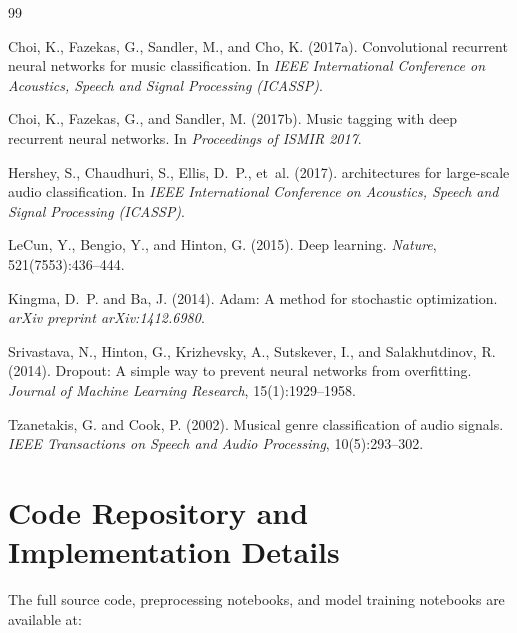 \documentclass[12pt, a4paper]{article}
\begin{document}
\begin{thebibliography}{99}

Choi, K., Fazekas, G., Sandler, M., and Cho, K. (2017a).
\newblock Convolutional recurrent neural networks for music classification.
\newblock In \textit{IEEE International Conference on Acoustics, Speech and Signal
Processing (ICASSP)}.

Choi, K., Fazekas, G., and Sandler, M. (2017b).
\newblock Music tagging with deep recurrent neural networks.
\newblock In \textit{Proceedings of ISMIR 2017}.

Hershey, S., Chaudhuri, S., Ellis, D.~P., et~al. (2017).
 architectures for large-scale audio classification.
\newblock In \textit{IEEE International Conference on Acoustics, Speech and Signal
Processing (ICASSP)}.

LeCun, Y., Bengio, Y., and Hinton, G. (2015).
\newblock Deep learning.
\newblock \textit{Nature}, 521(7553):436--444.

Kingma, D.~P. and Ba, J. (2014).
\newblock Adam: A method for stochastic optimization.
\newblock \textit{arXiv preprint arXiv:1412.6980}.

Srivastava, N., Hinton, G., Krizhevsky, A., Sutskever, I., and Salakhutdinov, R. (2014).
\newblock Dropout: A simple way to prevent neural networks from overfitting.
\newblock \textit{Journal of Machine Learning Research}, 15(1):1929--1958.

Tzanetakis, G. and Cook, P. (2002).
\newblock Musical genre classification of audio signals.
\newblock \textit{IEEE Transactions on Speech and Audio Processing}, 10(5):293--302.

\end{thebibliography}

\appendix
\section{Code Repository and Implementation Details}
\label{sec:appendix}

The full source code, preprocessing notebooks, and model training notebooks are
available at:
\end{document}

